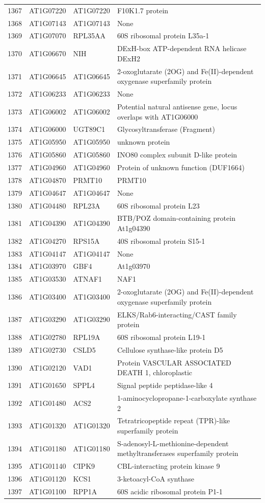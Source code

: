 \documentclass[11pt]{article}
\begin{document}
\begin{center}
\begin{tabular}{rlll}
1367 & AT1G07220 & AT1G07220 & F10K1.7 protein\\
1368 & AT1G07143 & AT1G07143 & None\\
1369 & AT1G07070 & RPL35AA & 60S ribosomal protein L35a-1\\
1370 & AT1G06670 & NIH & DExH-box ATP-dependent RNA helicase DExH2\\
1371 & AT1G06645 & AT1G06645 & 2-oxoglutarate (2OG) and Fe(II)-dependent oxygenase superfamily protein\\
1372 & AT1G06233 & AT1G06233 & None\\
1373 & AT1G06002 & AT1G06002 & Potential natural antisense gene, locus overlaps with AT1G06000\\
1374 & AT1G06000 & UGT89C1 & Glycosyltransferase (Fragment)\\
1375 & AT1G05950 & AT1G05950 & unknown protein\\
1376 & AT1G05860 & AT1G05860 & INO80 complex subunit D-like protein\\
1377 & AT1G04960 & AT1G04960 & Protein of unknown function (DUF1664)\\
1378 & AT1G04870 & PRMT10 & PRMT10\\
1379 & AT1G04647 & AT1G04647 & None\\
1380 & AT1G04480 & RPL23A & 60S ribosomal protein L23\\
1381 & AT1G04390 & AT1G04390 & BTB/POZ domain-containing protein At1g04390\\
1382 & AT1G04270 & RPS15A & 40S ribosomal protein S15-1\\
1383 & AT1G04147 & AT1G04147 & None\\
1384 & AT1G03970 & GBF4 & At1g03970\\
1385 & AT1G03530 & ATNAF1 & NAF1\\
1386 & AT1G03400 & AT1G03400 & 2-oxoglutarate (2OG) and Fe(II)-dependent oxygenase superfamily protein\\
1387 & AT1G03290 & AT1G03290 & ELKS/Rab6-interacting/CAST family protein\\
1388 & AT1G02780 & RPL19A & 60S ribosomal protein L19-1\\
1389 & AT1G02730 & CSLD5 & Cellulose synthase-like protein D5\\
1390 & AT1G02120 & VAD1 & Protein VASCULAR ASSOCIATED DEATH 1, chloroplastic\\
1391 & AT1G01650 & SPPL4 & Signal peptide peptidase-like 4\\
1392 & AT1G01480 & ACS2 & 1-aminocyclopropane-1-carboxylate synthase 2\\
1393 & AT1G01320 & AT1G01320 & Tetratricopeptide repeat (TPR)-like superfamily protein\\
1394 & AT1G01180 & AT1G01180 & S-adenosyl-L-methionine-dependent methyltransferases superfamily protein\\
1395 & AT1G01140 & CIPK9 & CBL-interacting protein kinase 9\\
1396 & AT1G01120 & KCS1 & 3-ketoacyl-CoA synthase\\
1397 & AT1G01100 & RPP1A & 60S acidic ribosomal protein P1-1\\
\end{tabular}
\end{center}
\end{document}

